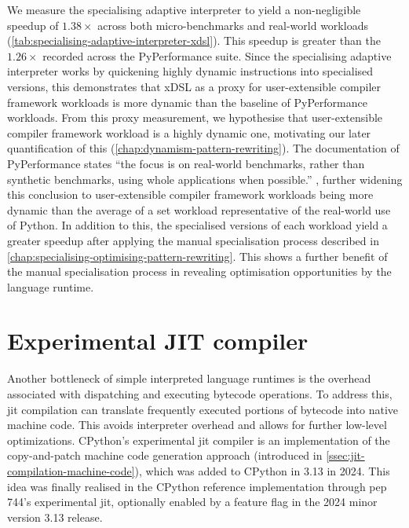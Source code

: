We measure the specialising adaptive interpreter to yield a non-negligible speedup of $1.38\times$ across both micro-benchmarks and real-world workloads (\autoref{tab:specialising-adaptive-interpreter-xdsl}).
This speedup is greater than the $1.26\times$ recorded across the PyPerformance suite.
Since the specialising adaptive interpreter works by quickening highly dynamic instructions into specialised versions, this demonstrates that xDSL as a proxy for user-extensible compiler framework workloads is more dynamic than the baseline of PyPerformance workloads. From this proxy measurement, we hypothesise that user-extensible compiler framework workload is a highly dynamic one, motivating our later quantification of this (\autoref{chap:dynamism-pattern-rewriting}).
The documentation of PyPerformance states ``the focus is on real-world benchmarks, rather than synthetic benchmarks, using whole applications when possible.'' \cite{collinwinterPythonPyperformance2025}, further widening this conclusion to user-extensible compiler framework workloads being more dynamic than the average of a set workload representative of the real-world use of Python.
In addition to this, the specialised versions of each workload yield a greater speedup after applying the manual specialisation process described in \autoref{chap:specialising-optimising-pattern-rewriting}. This shows a further benefit of the manual specialisation process in revealing optimisation opportunities by the language runtime.



\section{Experimental JIT compiler}
\label{sec:experimental-jit-compiler}

Another bottleneck of simple interpreted language runtimes is the overhead associated with dispatching and executing bytecode operations.
To address this, \acf{jit} compilation can translate frequently executed portions of bytecode into native machine code. This avoids interpreter overhead and allows for further low-level optimizations.
CPython's experimental \ac{jit} compiler is an implementation of the copy-and-patch machine code generation approach (introduced in \autoref{ssec:jit-compilation-machine-code}), which was added to CPython in 3.13 in 2024.
This idea was finally realised in the CPython reference implementation through \ac{pep} 744's experimental \ac{jit}, optionally enabled by a feature flag in the 2024 minor version 3.13 release.

